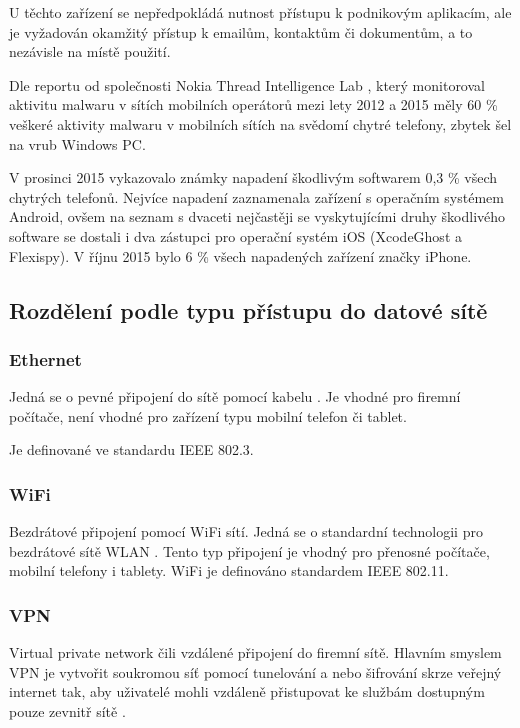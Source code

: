 U těchto zařízení se nepředpokládá nutnost přístupu k podnikovým aplikacím, ale je vyžadován okamžitý přístup k emailům, kontaktům či dokumentům, a to nezávisle na místě použití.

Dle reportu od společnosti Nokia Thread Intelligence Lab \cite{Nokia2, Nokia1}, který monitoroval aktivitu malwaru v sítích mobilních operátorů mezi lety 2012 a 2015 měly 60 \% veškeré aktivity malwaru v mobilních sítích na svědomí chytré telefony, zbytek šel na vrub Windows PC.

V prosinci 2015 vykazovalo známky napadení škodlivým softwarem 0,3 \% všech chytrých telefonů. Nejvíce napadení zaznamenala zařízení s operačním systémem Android, ovšem na seznam s dvaceti nejčastěji se vyskytujícími druhy škodlivého software se dostali i dva zástupci pro operační systém iOS (XcodeGhost a Flexispy). V říjnu 2015 bylo 6 \% všech napadených zařízení značky iPhone.
 
 
 \subsection{Rozdělení podle typu přístupu do datové sítě}
 \subsubsection{Ethernet}
 Jedná se o pevné připojení do sítě pomocí kabelu \cite{pcmagEthernet}. Je vhodné pro firemní počítače, není vhodné pro zařízení typu mobilní telefon či tablet.
 
 Je definované ve standardu IEEE 802.3.
 
 \subsubsection{WiFi}
 
 Bezdrátové připojení pomocí WiFi sítí. Jedná se o standardní technologii pro bezdrátové sítě WLAN \cite{pcmagWifi}. Tento typ připojení je vhodný pro přenosné počítače, mobilní telefony i tablety. WiFi je definováno standardem IEEE 802.11.
 
 \subsubsection{VPN}
 
 Virtual private network čili vzdálené připojení do firemní sítě. Hlavním smyslem VPN je vytvořit soukromou síť pomocí tunelování a nebo šifrování skrze veřejný internet tak, aby uživatelé mohli vzdáleně přistupovat ke službám dostupným pouze zevnitř sítě \cite{ciscoJournal}.
 
